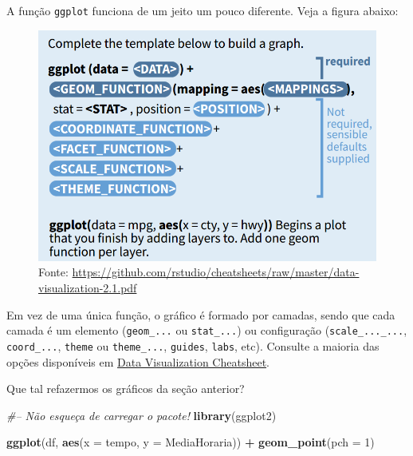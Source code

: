 \documentclass[]{book}
\newenvironment{Shaded}{\begin{snugshade}}{\end{snugshade}}
\newcommand{\KeywordTok}[1]{\textcolor[rgb]{0.13,0.29,0.53}{\textbf{#1}}}
\newcommand{\DataTypeTok}[1]{\textcolor[rgb]{0.13,0.29,0.53}{#1}}
\newcommand{\DecValTok}[1]{\textcolor[rgb]{0.00,0.00,0.81}{#1}}
\newcommand{\StringTok}[1]{\textcolor[rgb]{0.31,0.60,0.02}{#1}}
\newcommand{\CommentTok}[1]{\textcolor[rgb]{0.56,0.35,0.01}{\textit{#1}}}
\newcommand{\OperatorTok}[1]{\textcolor[rgb]{0.81,0.36,0.00}{\textbf{#1}}}
\newcommand{\NormalTok}[1]{#1}
\begin{document}
A função \texttt{ggplot} funciona de um jeito um pouco diferente. Veja a
figura abaixo:

\begin{figure}
\centering
\includegraphics{figuras/ggplot_guide.png}
\caption{Fonte:
\url{https://github.com/rstudio/cheatsheets/raw/master/data-visualization-2.1.pdf}}
\end{figure}

Em vez de uma única função, o gráfico é formado por camadas, sendo que
cada camada é um elemento (\texttt{geom\_...} ou \texttt{stat\_...}) ou
configuração (\texttt{scale\_...\_...}, \texttt{coord\_...},
\texttt{theme} ou \texttt{theme\_...}, \texttt{guides}, \texttt{labs},
etc). Consulte a maioria das opções disponíveis em
\href{https://github.com/rstudio/cheatsheets/raw/master/data-visualization-2.1.pdf}{Data
Visualization Cheatsheet}.

Que tal refazermos os gráficos da seção anterior?

\begin{Shaded}
\begin{Highlighting}[]
\CommentTok{#-- Não esqueça de carregar o pacote!}
\KeywordTok{library}\NormalTok{(ggplot2)}
\end{Highlighting}
\end{Shaded}

\begin{Shaded}
\begin{Highlighting}[]
\KeywordTok{ggplot}\NormalTok{(df, }\KeywordTok{aes}\NormalTok{(}\DataTypeTok{x =}\NormalTok{ tempo, }\DataTypeTok{y =}\NormalTok{ MediaHoraria)) }\OperatorTok{+}
\StringTok{  }\KeywordTok{geom_point}\NormalTok{(}\DataTypeTok{pch =} \DecValTok{1}\NormalTok{)}
\end{Highlighting}
\end{Shaded}
\end{document}
